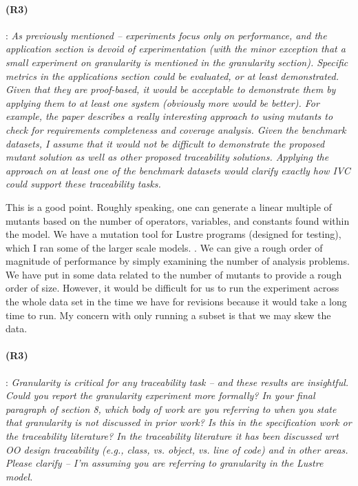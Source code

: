 \documentclass{article}
\begin{document}
\paragraph{(R3)}: \textit{As previously mentioned -- experiments focus only on performance, and the application section is devoid of experimentation (with the minor exception that a small experiment on granularity is mentioned in the granularity section). Specific metrics in the applications section could be evaluated, or at least demonstrated. Given that they are proof-based, it would be acceptable to demonstrate them by applying them to at least one system (obviously more would be better). For example, the paper describes a really interesting approach to using mutants to check for requirements completeness and coverage analysis. Given the benchmark datasets, I assume that it would not be difficult to demonstrate the proposed mutant solution as well as other proposed traceability solutions. Applying the approach on at least one of the benchmark datasets would clarify exactly how IVC could support these traceability tasks.}
\vspace{0.05in}

This is a good point.  Roughly speaking, one can generate a linear multiple of mutants based on the number of operators, variables, and constants found within the model.  We have a mutation tool for Lustre programs (designed for testing), which I ran some of the larger scale models. .  We can give a rough order of magnitude of performance by simply examining the number of analysis problems.  We have put in some data related to the number of mutants  to provide a rough order of size.  However, it would be difficult for us to run the experiment across the whole data set in the time we have for revisions because it would take a long time to run.  My concern with only running a subset is that we may skew the data.

\paragraph{(R3)}: \textit{Granularity is critical for any traceability task -- and these results are insightful. Could you report the granularity experiment more formally? In your final paragraph of section 8, which body of work are you referring to when you state that granularity is not discussed in prior work? Is this in the specification work or the traceability literature? In the traceability literature it has been discussed wrt OO design traceability (e.g., class, vs. object, vs. line of code) and in other areas. Please clarify -- I'm assuming you are referring to granularity in the Lustre model.}
\vspace{0.05in}
\end{document}
